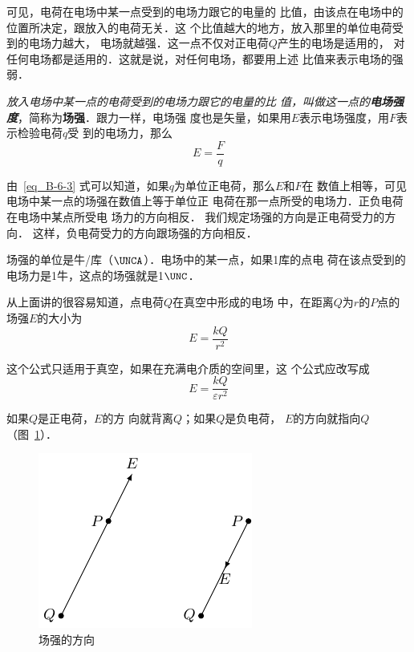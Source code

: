 可见，电荷在电场中某一点受到的电场力跟它的电量的
比值，由该点在电场中的位置所决定，跟放入的电荷无关．这
个比值越大的地方，放入那里的单位电荷受到的电场力越大，
电场就越强．这一点不仅对正电荷$Q$产生的电场是适用的，
对任何电场都是适用的．这就是说，对任何电场，都要用上述
比值来表示电场的强弱．

\textit{放入电场中某一点的电荷受到的电场力跟它的电量的比
值，叫做这一点的\textbf{电场强度}}，简称为\textbf{场强}．跟力一样，电场强
度也是矢量，如果用$E$表示电场强度，用$F$表示检验电荷$q$受
到的电场力，那么
\begin{equation}\label{eq_B-6-3}
    E=\frac{F}{q}
\end{equation}

由~\eqref{eq_B-6-3} 式可以知道，如果$q$为单位正电荷，那么$E$和$F$在
数值上相等，可见电场中某一点的场强在数值上等于单位正
电荷在那一点所受的电场力．正负电荷在电场中某点所受电
场力的方向相反．
我们规定场强的方向是正电荷受力的方向．
这样，负电荷受力的方向跟场强的方向相反．

场强的单位是牛/库（$\UNCA$）．电场中的某一点，如果1库的点电
荷在该点受到的电场力是1牛，这点的场强就是1$\UNC$．

从上面讲的很容易知道，点电荷$Q$在真空中形成的电场
中，在距离$Q$为$r$的$P$点的场强$E$的大小为
\begin{equation}\label{eq_B-6-4}
    E=\frac{kQ}{r^2}
\end{equation}

这个公式只适用于真空，如果在充满电介质的空间里，这
个公式应改写成
\begin{equation}\label{eq_B-6-5}
    E=\frac{kQ}{\varepsilon r^2}
\end{equation}

如果$Q$是正电荷，$E$的方
向就背离$Q$；如果$Q$是负电荷，
$E$的方向就指向$Q$（图~\ref{fig_B_6-5}）．
\begin{figure}[htbp]
    \centering
    \includegraphics{fig/B/6-5.pdf}
    \caption{场强的方向}\label{fig_B_6-5}
\end{figure}

